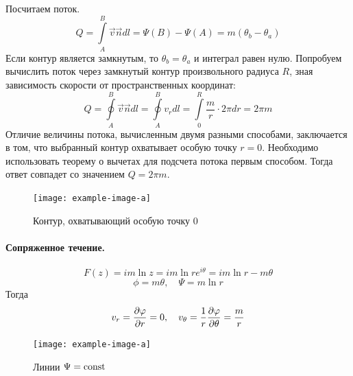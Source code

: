 Посчитаем поток. 
\begin{equation}
	Q=\int\limits_{A}^{B} \vec{v}\vec{n}dl=\Psi(B)-\Psi(A)=m(\theta_b-\theta_a)
\end{equation}
Если контур является замкнутым, то $\theta_b=\theta_a$ и интеграл равен нулю.
Попробуем вычислить поток через замкнутый контур произвольного радиуса $R$, зная зависимость скорости от пространственных координат: 
\begin{equation}
	Q=\oint\limits_{A}^{B} \vec{v}\vec{ n } dl=\oint\limits_{A}^{B} v_r dl=\int\limits_{0}^{R} \frac{m}{r} \cdot 2\pi dr =2\pi m%
\end{equation}
Отличие величины потока, вычисленным двумя разными способами, заключается в том, что выбранный контур охватывает особую точку $r=0$. Необходимо использовать теорему о вычетах для подсчета потока первым способом. Тогда ответ совпадет со значением $Q=2\pi m$.
\begin{figure}[h!]
    \centering
    \texttt{[image: example-image-a]}
    \caption{Контур, охватывающий особую точку 0}
    \label{fig:figure1}
\end{figure}

\paragraph{Сопряженное течение.}
\begin{equation}
	F(z)=im\ln{z}=im\ln{re^{i \theta}}=im\ln{r}-m\theta
\end{equation}
\begin{equation}
	\phi=m\theta, \quad
	\Psi=m\ln{r}
\end{equation}
Тогда
\begin{equation}
	v_r=\pdv{\varphi}{r}=0, \quad
	v_\theta=\frac{1}{r}\pdv{\varphi}{\theta}=\frac{m}{r}
\end{equation}

\begin{figure}[h!]
    \centering
    \texttt{[image: example-image-a]}
    \caption{Линии $\Psi=\mathrm{const}\,$}
    \label{fig:figure1}
\end{figure}

